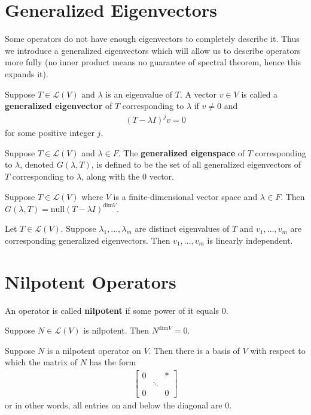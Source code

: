 \documentclass{memoir}
\begin{document}
\section{Generalized Eigenvectors}
\label{sec:generalized_eigenvectors}
Some operators do not have enough eigenvectors to completely describe it. Thus we introduce a generalized eigenvectors which will allow us to describe operators more fully (no inner product means no guarantee of spectral theorem, hence this expands it).
\begin{defn}
	Suppose \(T \in \mathcal{L}(V)\) and \(\lambda\) is an eigenvalue of \(T\). A vector \(v \in V\) is called a \textbf{generalized eigenvector} of \(T\) corresponding to \(\lambda\) if \(v\neq 0\) and
	\begin{align*}
		(T-\lambda I)^{j}v = 0
	\end{align*}
	for some positive integer \(j\).
\end{defn}
\begin{defn}
	Suppose \(T \in \mathcal{L}(V)\) and \(\lambda \in F\). The \textbf{generalized eigenspace} of \(T\) corresponding to \(\lambda\), denoted \(G(\lambda,T)\), is defined to be the set of all generalized eigenvectors of \(T\) corresponding to \(\lambda\), along with the 0 vector.
\end{defn}
\begin{prop}
	Suppose \(T \in \mathcal{L}(V)\) where \(V\) is a finite-dimensional vector space and \(\lambda \in F\). Then \(G(\lambda,T) = \textrm{null}(T-\lambda I)^{ \textrm{dim}V}\).
\end{prop}

\begin{prop}
	Let \(T \in \mathcal{L}(V)\). Suppose \(\lambda_1,\ldots,\lambda_m\) are distinct eigenvalues of \(T\) and \(v_1,\ldots,v_m\) are corresponding generalized eigenvectors. Then \(v_1,\ldots,v_m\) is linearly independent.
\end{prop}

\section{Nilpotent Operators}
\label{sec:nilpotent_operators}

\begin{defn}
	An operator is called \textbf{nilpotent} if some power of it equals \(0\).
\end{defn}
\begin{prop}
	Suppose \(N \in \mathcal{L}(V)\) is nilpotent. Then \(N^{ \textrm{dim}V} = 0\).
\end{prop}
\begin{prop}
	Suppose \(N\) is a nilpotent operator on \(V\). Then there is a basis of \(V\) with respect to which the matrix of \(N\) has the form
	\begin{align*}
		\begin{bmatrix} 0 & & * \\ & \ddots & \\ 0 & & 0 \end{bmatrix} 
	\end{align*}
or in other words, all entries on and below the diagonal are \(0\).
\end{prop}
\end{document}
